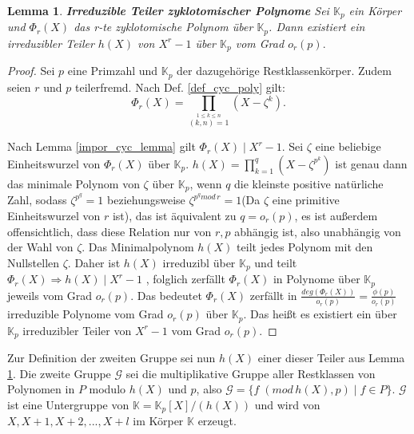 \documentclass[12pt,oneside]{article}
\newtheorem{lemma}[theorem]{Lemma}
\theoremstyle{remark}
\theoremstyle{definition}
\begin{document}
\begin{lemma}\label{cyc_ov_fields}
\textbf{Irreduzible Teiler zyklotomischer Polynome}
Sei $\mathbb{K}_{p}$ ein Körper und $\Phi_{r}(X)$ das r-te zyklotomische Polynom über $\mathbb{K}_{p}$. Dann existiert ein irreduzibler Teiler $h(X)$ von $X^r - 1$ über $\mathbb{K}_{p}$ vom Grad $o_{r}(p).$
\end{lemma}

\begin{proof}
    Sei $p$ eine Primzahl und $\mathbb{K}_{p}$ der dazugehörige Restklassenkörper. Zudem seien $r$ und $p$ teilerfremd. Nach Def. \ref{def_cyc_poly} gilt: 
    \begin{equation}\label{rth_cy}
        \Phi _{r}(X)=\prod _{\stackrel {1\leq k\leq n}{(k,n)=1}}\left(X- \zeta^k\right).
    \end{equation}
    
Nach Lemma \ref{impor_cyc_lemma} gilt $\Phi_{r}(X) \mid  X^{r} - 1$. Sei $\zeta$ eine beliebige Einheitswurzel von $\Phi_r(X)$  über $\mathbb{K}_p$. $h(X) = \prod_{k = 1}^{q} (X - \zeta^{p^k})$ ist genau dann das minimale Polynom von $\zeta$ über $\mathbb{K}_p$, wenn $q$ die kleinste positive natürliche Zahl, sodass $\zeta^{p^q} = 1$ beziehungsweise $\zeta^{p^q mod \, r} = 1$(Da $\zeta$ eine primitive Einheitswurzel von $r$ ist), das ist äquivalent zu $q = o_r(p)$, es ist außerdem offensichtlich, dass diese Relation nur von $r,p$ abhängig ist, also unabhängig von der Wahl von $\zeta$. Das Minimalpolynom $h(X)$ teilt jedes Polynom mit den Nullstellen $\zeta$. Daher ist $h(X)$ irreduzibl über $\mathbb{K}_p$ und teilt $\Phi_{r}(X) \Rightarrow h(X) \mid X^r - 1$ , folglich zerfällt $\Phi_r(X)$ in Polynome über $\mathbb{K}_p$ jeweils vom Grad $o_r(p)$. Das bedeutet $\Phi_{r}(X)$ zerfällt in $\frac{deg(\Phi_{r}(X))}{o_r(p)} = \frac{\phi(p)}{o_r(p)}$ irreduzible Polynome vom Grad $o_r(p)$ über $\mathbb{K}_p$. Das heißt es existiert ein über $\mathbb{K}_p$ irreduzibler Teiler von $X^r - 1$ vom Grad $o_r(p)$.              
\end{proof}

Zur Definition der zweiten Gruppe sei nun $h(X)$ einer dieser Teiler aus Lemma \ref{cyc_ov_fields}. Die zweite Gruppe $\mathcal{G}$ sei die multiplikative Gruppe aller Restklassen von Polynomen in $P$ modulo $h(X)$ und $p$, also $\mathcal{G} = \{f \; (mod \, h(X), p) \mid f \in P \}$. $\mathcal{G}$ ist eine Untergruppe von $\mathbb{K} = \mathbb{K}_p[X] / (h(X))$ und wird von $X,X+1,X+2, ..., X + l $ im Körper $\mathbb{K}$ erzeugt.\newline
\end{document}
